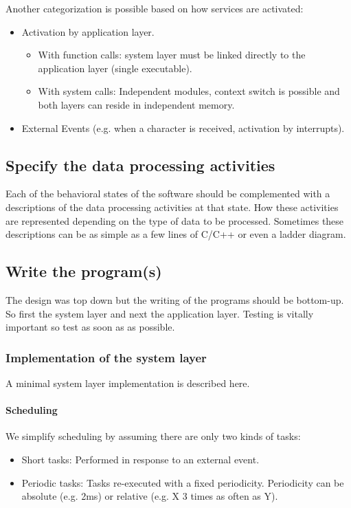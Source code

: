 \documentclass[../main.tex]{subfiles}
\begin{document}
Another categorization is possible based on how services are activated: 
\begin{itemize}
	\item Activation by application layer. 
	\begin{itemize}
		\item With function calls: system layer must be linked directly to the application layer (single executable). 
		\item With system calls: Independent modules, context switch is possible and both layers can reside in independent memory.  
	\end{itemize}
	\item External Events (e.g. when a character is received, activation by interrupts). 
\end{itemize}

\subsection{Specify the data processing activities}
\label{sss:activities}
Each of the behavioral states of the software should be complemented with a descriptions of the  data processing activities at that state.
How these activities are represented depending on the type of data to be processed.
Sometimes these descriptions can be as simple as a few lines of C/C++ or even a ladder diagram.




\subsection{Write the program(s)}
\label{sss:write}
The design was top down but the writing of the programs should be bottom-up. So first the system layer and next the application layer. 
Testing is vitally important so test as soon as as possible.

\subsubsection{Implementation of the system layer}
A minimal  system layer implementation is described here.

\paragraph{Scheduling}
We simplify  scheduling by assuming there are only two kinds of tasks:
\begin{itemize}
	\item Short tasks: Performed in response to an external event.
	\item Periodic tasks: Tasks re-executed with a fixed periodicity. Periodicity can be absolute (e.g. 2ms) or relative (e.g. X 3 times as often as Y).
\end{itemize}
\end{document}
